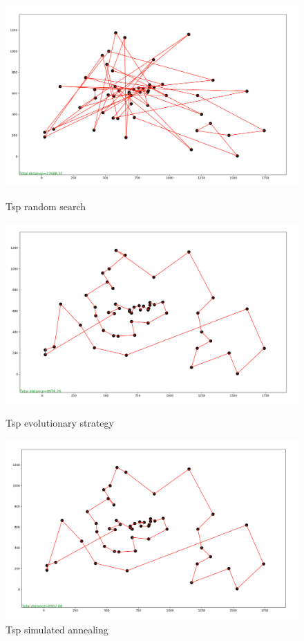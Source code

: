 \documentclass{article}
\begin{document}
\begin{figure}[H]
	\begin{minipage}{0.33\textwidth}
		\centering
		\includegraphics[width=1\textwidth]{../../image/randomsearch/randomsearch-berlin52.png}
		\caption{\label{fig:Figura1} Tsp random search}
	\end{minipage}\hfill
	\begin {minipage}{0.33\textwidth}
	\centering
	\includegraphics[width=1\textwidth]{../../image/evolutionarystrategy/evolutionarystrategy-berlin52.png}
	\caption{\label{fig:Figura1} Tsp evolutionary strategy}
\end{minipage}
\begin {minipage}{0.33\textwidth}
\centering
\includegraphics[width=1\textwidth]{../../image/simulatedannealing/simulatedannealing-berlin52.png}
\caption{\label{fig:Figura1} Tsp simulated annealing}
\end{minipage}
\end{figure}
\end{document}

